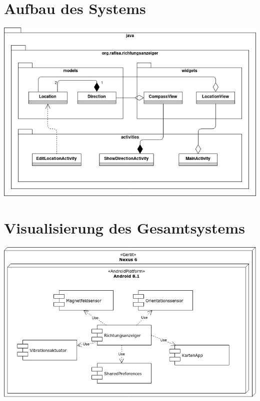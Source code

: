 \documentclass[12pt,a4paper]{scrartcl}
\begin{document}
\section{Aufbau des Systems}


\includegraphics[width=15.0cm]{../system.jpg}

\section{Visualisierung des Gesamtsystems}


\includegraphics[width=15.0cm]{../aufbau.jpg}
\end{document}
